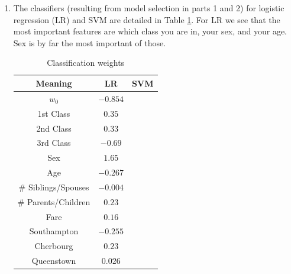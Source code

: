 \documentclass[10pt]{article}
\begin{document}
\begin{enumerate}
 \item The classifiers (resulting from model selection in parts 1 and 2) for logistic regression (LR) and SVM are detailed in Table \ref{weights}. For LR we see that the most important features are which class you are in, your sex, and your age. Sex is by far the most important of those.
 \begin{table}[H]
 \begin{tabular}{|c|c|c|}
 \hline
 Meaning & LR & SVM \\ \hline
 $w_0$ & $-0.854$ & \\ \hline
 1st Class & $0.35$ & \\ \hline
 2nd Class & $0.33$ & \\ \hline
 3rd Class & $-0.69$ & \\ \hline
 Sex  & $1.65$ & \\ \hline
 Age & $-0.267$ & \\ \hline
 \# Siblings/Spouses & $-0.004$ & \\ \hline
 \# Parents/Children & $0.23$ & \\ \hline
 Fare & $0.16$ & \\ \hline
 Southampton & $-0.255$ & \\ \hline
 Cherbourg & $0.23$ & \\ \hline
 Queenstown & $0.026$ & \\ \hline
 \end{tabular}
 \caption{Classification weights}
 \label{weights}
 \end{table}


\end{enumerate}
\end{document}
